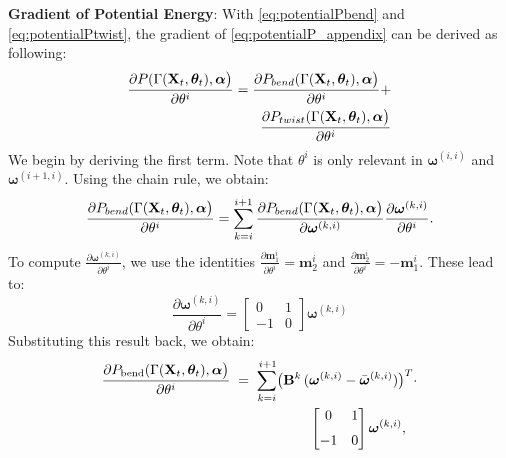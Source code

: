 \textbf{Gradient of Potential Energy}: With \eqref{eq:potentialPbend} and \eqref{eq:potentialPtwist}, the gradient of \eqref{eq:potentialP_appendix} can be derived as following:
\begin{equation}
      \begin{split}
    \label{eq:potentialderivative}
    \frac{\partial P(\Gamma(\mathbf{X}_t, \bm{\theta}_t), \bm{\alpha}\bigr)}{\partial \theta^i}  = 
    \frac{\partial P_{bend}(\Gamma(\mathbf{X}_t, \bm{\theta}_t), \bm{\alpha}\bigr)}{\partial \theta^i}  + \\  \frac{\partial P_{twist}(\Gamma(\mathbf{X}_t, \bm{\theta}_t), \bm{\alpha}\bigr)}{\partial \theta^i} 
        \end{split}
\end{equation}
We begin by deriving the first term. 
Note that $\theta^i$ is only relevant in $\bm{\omega}^{(i,i)}$ and $\bm{\omega}^{(i+1,i)}$. 
Using the chain rule, we obtain:
\begin{equation}
    \frac{\partial P_{bend}(\Gamma(\mathbf{X}_t, \bm{\theta}_t), \bm{\alpha}\bigr)}{\partial \theta^i}  = 
    \sum_{k=i}^{i+1} \frac{\partial P_{bend}(\Gamma(\mathbf{X}_t, \bm{\theta}_t), \bm{\alpha}\bigr)}{\partial \bm{\omega}^{(k,i)}} \frac{\partial \bm{\omega}^{(k,i)}}{\partial \theta^i}.
\end{equation}
To compute $\frac{\partial \bm{\omega}^{(k,i)}}{\partial \theta^i}$, we use the identities $\frac{\partial \mathbf{m}_1^i}{\partial \theta^i} = \mathbf{m}_2^i$ and $\frac{\partial \mathbf{m}_2^i}{\partial \theta^i} = -\mathbf{m}_1^i$.
These lead to:
\begin{equation}
    \frac{\partial \bm{\omega}^{(k, i)}}{\partial \theta^i} = \begin{bmatrix}
0 & 1 \\
-1 & 0
\end{bmatrix} \bm{\omega}^{(k, i)}
\end{equation}
Substituting this result back, we obtain:
\begin{equation}
    \begin{split}
  \frac{\partial P_{\mathrm{bend}}(\Gamma(\mathbf{X}_t, \bm{\theta}_t), \bm{\alpha}\bigr)}{\partial \theta^i}
  \;=\; 
  \sum_{k=i}^{\,i+1}
  \bigl(\mathbf{B}^k\, (&\bm{\omega}^{(k,i)}  - \bar{\bm{\omega}}^{(k,i)})\bigr)^{T} \cdot
  \\
    &\begin{bmatrix}0 & 1\\[6pt]-1 & 0\end{bmatrix}
  \bm{\omega}^{(k,i)},
      \end{split}
      \label{eq:potentialbendgradient}
\end{equation}
